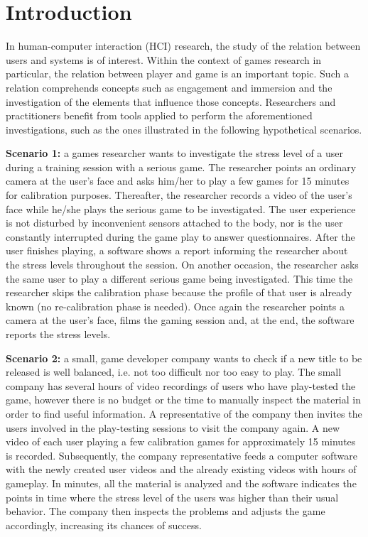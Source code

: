 \chapter{Introduction}
\label{c:introduction}

In human-computer interaction (HCI) research, the study of the relation between users and systems is of interest. Within the context of games research in particular, the relation between player and game is an important topic. Such a relation comprehends concepts such as engagement and immersion \parencite{boyle2012engagement} and the investigation of the elements that influence those concepts. Researchers and practitioners benefit from tools applied to perform the aforementioned investigations, such as the ones illustrated in the following hypothetical scenarios.

\textbf{Scenario 1:} a games researcher wants to investigate the stress level of a user during a training session with a serious game. The researcher points an ordinary camera at the user's face and asks him/her to play a few games for 15 minutes for calibration purposes. Thereafter, the researcher records a video of the user's face while he/she plays the serious game to be investigated. The user experience is not disturbed by inconvenient sensors attached to the body, nor is the user constantly interrupted during the game play to answer questionnaires. After the user finishes playing, a software shows a report informing the researcher about the stress levels throughout the session. On another occasion, the researcher asks the same user to play a different serious game being investigated. This time the researcher skips the calibration phase because the profile of that user is already known (no re-calibration phase is needed). Once again the researcher points a camera at the user's face, films the gaming session and, at the end, the software reports the stress levels.

\textbf{Scenario 2:} a small, game developer company wants to check if a new title to be released is well balanced, i.e. not too difficult nor too easy to play. The small company has several hours of video recordings of users who have play-tested the game, however there is no budget or the time to manually inspect the material in order to find useful information. A representative of the company then invites the users involved in the play-testing sessions to visit the company again. A new video of each user playing a few calibration games for approximately 15 minutes is recorded. Subsequently, the company representative feeds a computer software with the newly created user videos and the already existing videos with hours of gameplay. In minutes, all the material is analyzed and the software indicates the points in time where the stress level of the users was higher than their usual behavior. The company then inspects the problems and adjusts the game accordingly, increasing its chances of success.

